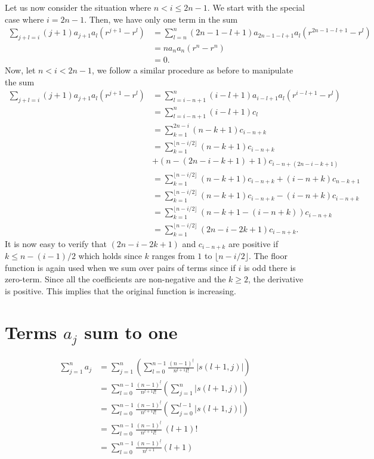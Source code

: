 \documentclass[12pt]{article}
\newcommand{\Le}{\left(}
\newcommand{\Ri}{\right)}
\begin{document}
Let us now consider the situation where $n < i \leq 2n-1$. We start with the special case where $i = 2n-1$. Then, we have only one term in the sum
\begin{align*}
\sum_{j+l = i}(j+1)a_{j+1}a_l  (r^{j+1}- r^l) &= \sum_{l=n}^{n}(2n-1-l+1)a_{2n-1-l+1}a_l  (r^{2n-1-l+1}- r^l) \\
&= na_{n}a_n  (r^{n}- r^n) \\
& = 0.
\end{align*}Now, let $n < i < 2n-1$, we follow a similar procedure as before to manipulate the sum
\begin{align*}
\sum_{j+l = i}(j+1)a_{j+1}a_l  (r^{j+1}- r^l) &= \sum_{l=i-n + 1}^{n}(i-l+1)a_{i-l+1}a_l  (r^{i-l+1}- r^l) \\
& = \sum_{l=i-n + 1}^{n}(i-l+1)c_l \\
& = \sum_{k=1}^{2n-i}(n-k+1)c_{i-n+k} \\
& = \sum_{k=1}^{\lfloor n - i/2 \rfloor}(n-k+1)c_{i-n+k}\\
&+  (n-(2n-i-k+1)+1)c_{i-n+(2n-i-k+1)} \\
&= \sum_{k=1}^{\lfloor n - i/2 \rfloor}(n-k+1)c_{i-n+k} +  (i-n+k)c_{n-k+1} \\
&= \sum_{k=1}^{\lfloor n - i/2 \rfloor}(n-k+1)c_{i-n+k} -  (i-n+k)c_{i-n+k} \\
&= \sum_{k=1}^{\lfloor n - i/2 \rfloor}(n-k+1-(i-n+k))c_{i-n+k} \\
&= \sum_{k=1}^{\lfloor n - i/2 \rfloor}(2n-i-2k+1)c_{i-n+k}.
\end{align*}It is now easy to verify that $(2n-i-2k+1)$ and $c_{i-n+k}$ are positive if $k \leq n - (i-1)/2$ which holds since $k$ ranges from $1$ to $\lfloor n - i/2 \rfloor$. The floor function is again used when we sum over pairs of terms since if $i$ is odd there is zero-term. 
Since all the coefficients are non-negative and the $k \geq 2$, the derivative is positive. This implies that the original function is increasing.


\section{Terms $a_j$ sum to one}
\begin{align*}
\sum_{j=1}^{n}a_j &=\sum_{j=1}^{n} \Le \sum_{l=0}^{n-1} \frac{(n-1)^{\underline{l}}}{n^{l+1}l!} \ |s(l + 1,j)| \Ri \\
&= \sum_{l=0}^{n-1} \frac{(n-1)^{\underline{l}}}{n^{l+1}l!} \Le \sum_{j=1}^{n} |s(l + 1,j)| \Ri \\
&= \sum_{l=0}^{n-1} \frac{(n-1)^{\underline{l}}}{n^{l+1}l!} \Le \sum_{j=0}^{l-1} |s(l + 1,j)| \Ri \\
&= \sum_{l=0}^{n-1} \frac{(n-1)^{\underline{l}}}{n^{l+1}l!} \ (l+1)! \\
& =  \sum_{l=0}^{n-1} \frac{(n-1)^{\underline{l}}}{n^{l+1}}(l+1)
\end{align*}
\end{document}
